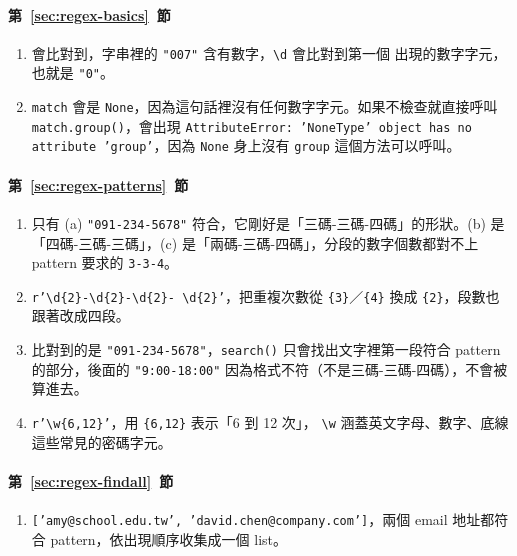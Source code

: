 \paragraph{第~\ref{sec:regex-basics}~節}
\begin{enumerate}
\item 會比對到，字串裡的 \texttt{"007"} 含有數字，\texttt{\textbackslash d} 會比對到第一個
出現的數字字元，也就是 \texttt{"0"}。
\item \texttt{match} 會是 \texttt{None}，因為這句話裡沒有任何數字字元。如果不檢查就直接呼叫
\texttt{match.group()}，會出現
\texttt{AttributeError: 'NoneType' object has no attribute 'group'}，因為 \texttt{None}
身上沒有 \texttt{group} 這個方法可以呼叫。
\end{enumerate}

\paragraph{第~\ref{sec:regex-patterns}~節}
\begin{enumerate}
\item 只有 (a) \texttt{"091-234-5678"} 符合，它剛好是「三碼-三碼-四碼」的形狀。(b) 是
「四碼-三碼-三碼」，(c) 是「兩碼-三碼-四碼」，分段的數字個數都對不上 pattern 要求的
\texttt{3-3-4}。
\item \texttt{r'\textbackslash d\{2\}-\textbackslash d\{2\}-\textbackslash d\{2\}-%
\textbackslash d\{2\}'}，把重複次數從 \texttt{\{3\}}／\texttt{\{4\}} 換成
\texttt{\{2\}}，段數也跟著改成四段。
\item 比對到的是 \texttt{"091-234-5678"}，\texttt{search()} 只會找出文字裡第一段符合
pattern 的部分，後面的 \texttt{"9:00-18:00"} 因為格式不符（不是三碼-三碼-四碼），不會被
算進去。
\item \texttt{r'\textbackslash w\{6,12\}'}，用 \texttt{\{6,12\}} 表示「6 到 12 次」，
\texttt{\textbackslash w} 涵蓋英文字母、數字、底線這些常見的密碼字元。
\end{enumerate}

\paragraph{第~\ref{sec:regex-findall}~節}
\begin{enumerate}
\item \texttt{['amy@school.edu.tw', 'david.chen@company.com']}，兩個 email 地址都符合
pattern，依出現順序收集成一個 list。
\end{enumerate}

